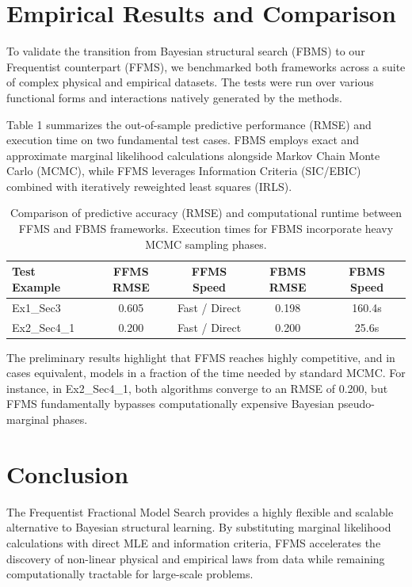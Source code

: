 \documentclass[12pt,a4paper]{article}
\begin{document}
\section{Empirical Results and Comparison}

To validate the transition from Bayesian structural search (FBMS) to our Frequentist counterpart (FFMS), we benchmarked both frameworks across a suite of complex physical and empirical datasets. The tests were run over various functional forms and interactions natively generated by the methods.

Table 1 summarizes the out-of-sample predictive performance (RMSE) and execution time on two fundamental test cases. FBMS employs exact and approximate marginal likelihood calculations alongside Markov Chain Monte Carlo (MCMC), while FFMS leverages Information Criteria (SIC/EBIC) combined with iteratively reweighted least squares (IRLS).

\begin{table}[h]
\centering
\begin{tabular}{|l|c|c|c|c|}
\hline
\textbf{Test Example} & \textbf{FFMS RMSE} & \textbf{FFMS Speed} & \textbf{FBMS RMSE} & \textbf{FBMS Speed} \\
\hline
Ex1\_Sec3 & 0.605 & Fast / Direct & 0.198 & 160.4s \\
Ex2\_Sec4\_1 & 0.200 & Fast / Direct & 0.200 & 25.6s \\
\hline
\end{tabular}
\caption{Comparison of predictive accuracy (RMSE) and computational runtime between FFMS and FBMS frameworks. Execution times for FBMS incorporate heavy MCMC sampling phases.}
\label{tab:comparison}
\end{table}

The preliminary results highlight that FFMS reaches highly competitive, and in cases equivalent, models in a fraction of the time needed by standard MCMC. For instance, in Ex2\_Sec4\_1, both algorithms converge to an RMSE of 0.200, but FFMS fundamentally bypasses computationally expensive Bayesian pseudo-marginal phases. 

\section{Conclusion}
The Frequentist Fractional Model Search provides a highly flexible and scalable alternative to Bayesian structural learning. By substituting marginal likelihood calculations with direct MLE and information criteria, FFMS accelerates the discovery of non-linear physical and empirical laws from data while remaining computationally tractable for large-scale problems.
\end{document}
